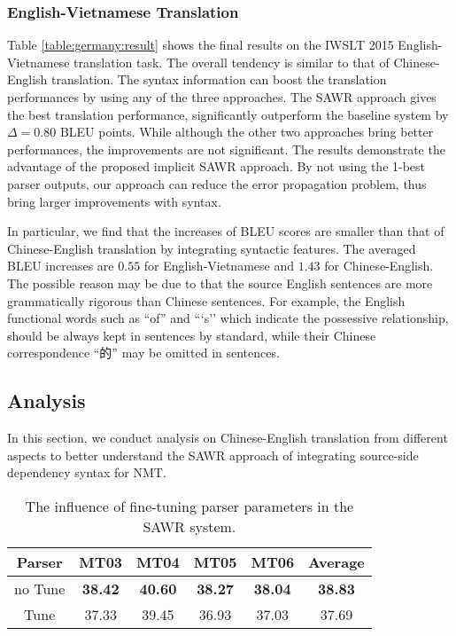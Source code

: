 \documentclass[11pt,a4paper]{article}
\begin{document}
\begin{CJK}{UTF8}{gbsn}
\subsubsection{English-Vietnamese Translation}
Table \ref{table:germany:result} shows the final results on the IWSLT 2015 English-Vietnamese translation task.
The overall tendency is similar to that of Chinese-English translation.
The syntax information can boost the translation performances by using any of the three approaches.
The SAWR approach gives the best translation performance,
significantly outperform the baseline system by $\Delta = 0.80$ BLEU points.
While although the other two approaches bring better performances,
the improvements are not significant.
The results demonstrate the advantage of the proposed implicit SAWR approach.
By not using the 1-best parser outputs,
our approach can reduce the error propagation problem, thus bring larger improvements with syntax.


In particular, we find that the increases of BLEU scores are smaller than that of Chinese-English translation
by integrating syntactic features.
The averaged BLEU increases are $0.55$ for English-Vietnamese
and $1.43$ for Chinese-English.
The possible reason may be due to that the source English sentences are more grammatically rigorous than Chinese sentences.
For example, the English functional words such as ``of'' and ```s''
which indicate the possessive relationship,  should be always kept in sentences by standard,
while their Chinese correspondence ``的'' may be omitted in sentences.








\subsection{Analysis}

In this section, we conduct analysis on Chinese-English translation from different aspects
to better understand the SAWR approach of integrating source-side dependency syntax for NMT.



\setlength{\tabcolsep}{3.0pt}
\begin{table}[t]
	\begin{center}
\begin{tabular}{c|cccc|c}
				\hline
				Parser &  MT03  & MT04  & MT05  & MT06 & Average \\ \hline
				no Tune & \bf 38.42  &   \bf 40.60  &  \bf 38.27  &  \bf 38.04   & \bf 38.83 \\
				Tune & 37.33 & 39.45 & 36.93 & 37.03 & 37.69   \\ \hline
\end{tabular}
			\caption{The influence of fine-tuning parser parameters in the SAWR system. }
			\label{table:analyze:tune}
\end{center}
\end{table}


\end{CJK}
\end{document}
